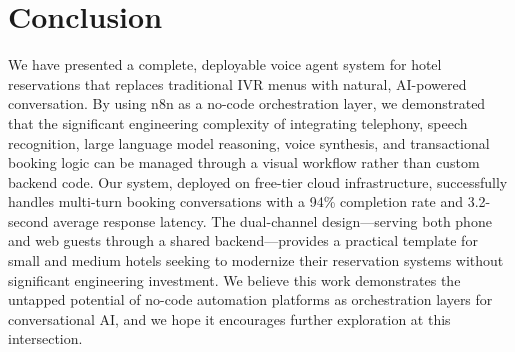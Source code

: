 \documentclass[conference]{IEEEtran}
\begin{document}
\section{Conclusion}

We have presented a complete, deployable voice agent system for hotel reservations that replaces traditional IVR menus with natural, AI-powered conversation. By using n8n as a no-code orchestration layer, we demonstrated that the significant engineering complexity of integrating telephony, speech recognition, large language model reasoning, voice synthesis, and transactional booking logic can be managed through a visual workflow rather than custom backend code. Our system, deployed on free-tier cloud infrastructure, successfully handles multi-turn booking conversations with a 94\% completion rate and 3.2-second average response latency. The dual-channel design---serving both phone and web guests through a shared backend---provides a practical template for small and medium hotels seeking to modernize their reservation systems without significant engineering investment. We believe this work demonstrates the untapped potential of no-code automation platforms as orchestration layers for conversational AI, and we hope it encourages further exploration at this intersection.

\end{document}
